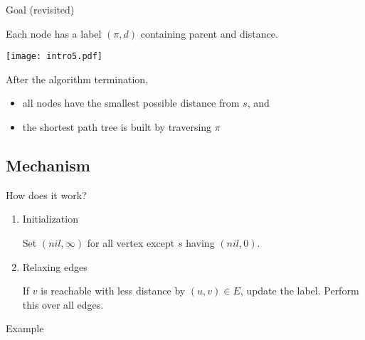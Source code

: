 \documentclass{beamer}
\begin{document}
\begin{frame}{Goal (revisited)}

Each node has a label $(\pi,d)$ containing parent and distance.

\texttt{[image: intro5.pdf]}

After the algorithm termination,
\begin{itemize}
\item all nodes have the smallest possible distance from $s$, and
\item the shortest path tree is built by traversing $\pi$
\end{itemize}

\end{frame}

\subsection{Mechanism}

\begin{frame}{How does it work?}

\begin{enumerate}

\item \alert{Initialization}

Set $(nil,\infty)$ for all vertex except $s$ having $(nil,0)$.\newline

\item \alert{Relaxing edges}

If $v$ is reachable with less distance by $(u,v)\in E$, update the
label. Perform this over all edges.


\end{enumerate}

\end{frame}

\begin{frame}{Example}

\end{frame}
\end{document}

